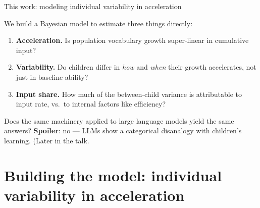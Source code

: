 \documentclass[
  ignorenonframetext,
  aspectratio=169,
  t]{beamer}
\begin{document}
\begin{frame}{This work: modeling individual variability in
acceleration}
\label{this-work-modeling-individual-variability-in-acceleration}
\small

We build a Bayesian model to estimate three things directly:

\vspace{0.6em}

\begin{enumerate}
\item
  \textbf{Acceleration.} Is population vocabulary growth super-linear in
  cumulative input?
\item
  \textbf{Variability.} Do children differ in \emph{how} and \emph{when}
  their growth accelerates, not just in baseline ability?
\item
  \textbf{Input share.} How much of the between-child variance is
  attributable to input rate, vs.~to internal factors like efficiency?
\end{enumerate}

\vspace{0.8em}

Does the same machinery applied to large language models yield the same
answers? \textbf{Spoiler}: no --- LLMs show a categorical disanalogy
with children's learning. (Later in the talk.
\end{frame}

\section{Building the model: individual variability in
acceleration}\label{building-the-model-individual-variability-in-acceleration}
\end{document}
